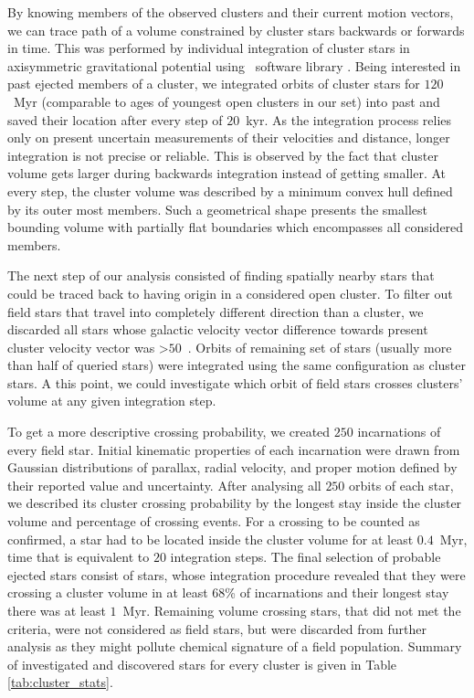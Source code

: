 By knowing members of the observed clusters and their current motion vectors, we can trace path of a volume constrained by cluster stars backwards or forwards in time. This was performed by individual integration of cluster stars in axisymmetric gravitational potential \citep[\textit{MWPotential2014} potential,][]{2015ApJS..216...29B} using \GP\ software library \citep[version 1.5.0.,][]{2015ApJS..216...29B}. Being interested in past ejected members of a cluster, we integrated orbits of cluster stars for $120$~Myr (comparable to ages of youngest open clusters in our set) into past and saved their location after every step of $20$~kyr. As the integration process relies only on present uncertain measurements of their velocities and distance, longer integration is not precise or reliable. This is observed by the fact that cluster volume gets larger during backwards integration instead of getting smaller. At every step, the cluster volume was described by a minimum convex hull defined by its outer most members. Such a geometrical shape presents the smallest bounding volume with partially flat boundaries which encompasses all considered members.

The next step of our analysis consisted of finding spatially nearby stars that could be traced back to having origin in a considered open cluster. To filter out field stars that travel into completely different direction than a cluster, we discarded all stars whose galactic velocity vector difference towards present cluster velocity vector was >$50$~\kms.  Orbits of remaining set of stars (usually more than half of queried stars) were integrated using the same configuration as cluster stars. A this point, we could investigate which orbit of field stars crosses clusters' volume at any given integration step.

To get a more descriptive crossing probability, we created $250$ incarnations of every field star. Initial kinematic properties of each incarnation were drawn from Gaussian distributions of parallax, radial velocity, and proper motion defined by their reported value and uncertainty. After analysing all $250$ orbits of each star, we described its cluster crossing probability by the longest stay inside the cluster volume and percentage of crossing events. For a crossing to be counted as confirmed, a star had to be located inside the cluster volume for at least $0.4$~Myr, time that is equivalent to $20$ integration steps. The final selection of probable ejected stars consist of stars, whose integration procedure revealed that they were crossing a cluster volume in at least $68$\% of incarnations and their longest stay there was at least $1$~Myr. Remaining volume crossing stars, that did not met the criteria, were not considered as field stars, but were discarded from further analysis as they might pollute chemical signature of a field population. Summary of investigated and discovered stars for every cluster is given in Table \ref{tab:cluster_stats}.

